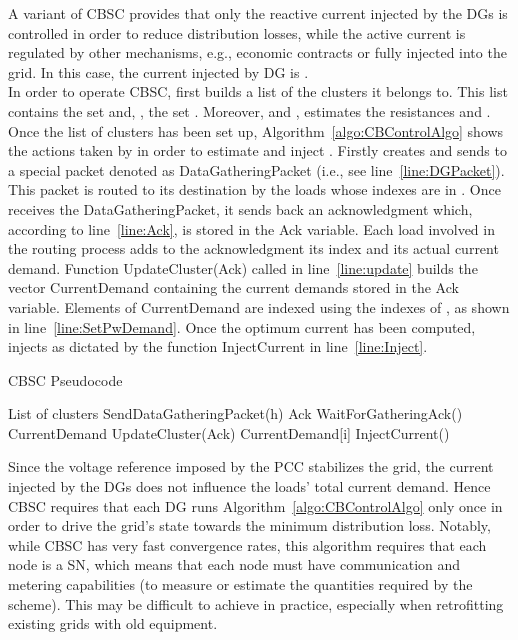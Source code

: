 \documentclass[journal]{IEEEtran}
\begin{document}
A variant of CBSC provides that only the reactive current injected by the DGs is controlled in order to reduce distribution losses, while the active current is regulated by other mechanisms, e.g., economic contracts or fully injected into the grid. In this case, the current injected by DG  is .\\
In order to operate CBSC,  first builds a list of the clusters it belongs to. This list contains the set  and, \mbox{}, the set . Moreover,  and ,  estimates the resistances  and . Once the list of clusters has been set up, Algorithm~\ref{algo:CBControlAlgo} shows the actions taken by  in order to estimate and inject . Firstly  creates and sends to  a special packet denoted as DataGatheringPacket (i.e., see line~\ref{line:DGPacket}). This packet is routed to its destination by the loads whose indexes are in . Once  receives the DataGatheringPacket, it sends back an acknowledgment which, according to line~\ref{line:Ack}, is stored in the Ack variable. Each load involved in the routing process adds to the acknowledgment its index and its actual current demand. Function UpdateCluster(Ack) called in line~\ref{line:update} builds the vector CurrentDemand containing the current demands stored in the Ack variable. Elements of CurrentDemand are indexed using the indexes of , as shown in line~\ref{line:SetPwDemand}. Once the optimum current has been computed,  injects  as dictated by the function InjectCurrent in line~\ref{line:Inject}.

\begin{algorithm}
\caption{CBSC Pseudocode}\label{algo:CBControlAlgo}
\begin{algorithmic}[1]
\REQUIRE List of clusters
\FORALL{}
\STATE SendDataGatheringPacket(h) \label{line:DGPacket}
\STATE Ack  WaitForGatheringAck() \label{line:Ack}
\STATE CurrentDemand  UpdateCluster(Ack) \label{line:update}
\STATE    \label{line:InitCurrent}
\FORALL{}
\STATE   CurrentDemand[i] \label{line:SetPwDemand}
\STATE    \label{line:ComputeOptC}
\ENDFOR
\STATE     \label{line:UpdateOptC}
\ENDFOR
\STATE InjectCurrent()  \label{line:Inject}
\end{algorithmic}
\end{algorithm}
Since the voltage reference imposed by the PCC stabilizes the grid, the current injected by the DGs does not influence the loads' total current demand. Hence CBSC requires that each DG runs Algorithm~\ref{algo:CBControlAlgo} only once in order to drive the grid's state towards the minimum distribution loss. Notably, while CBSC has very fast convergence rates, this algorithm requires that each node is a SN, which means that each node must have communication and metering capabilities (to measure or estimate the quantities required by the scheme). This may be difficult to  achieve in practice, especially when retrofitting existing grids with old equipment.
\end{document}
